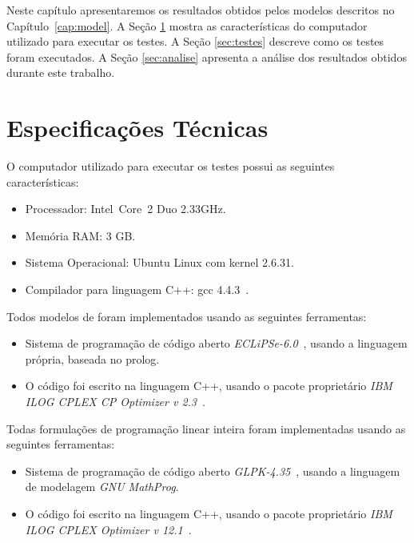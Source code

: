 Neste capítulo apresentaremos os resultados obtidos pelos modelos
descritos no Capítulo~\ref{cap:model}. A Seção \ref{sec:tspec} mostra
as características do computador utilizado para executar os testes. A
Seção \ref{sec:testes} descreve como os testes foram executados. A
Seção \ref{sec:analise} apresenta a análise dos resultados obtidos
durante este trabalho.

\section{Especificações Técnicas}
\label{sec:tspec}
O computador utilizado para executar os testes possui as seguintes
características:

\begin{itemize}
  \item{Processador: Intel\textregistered{}~Core\texttrademark~2 Duo
  2.33GHz.}

  \item{Memória RAM: 3 GB.}
  
  \item{Sistema Operacional: Ubuntu Linux com kernel 2.6.31.}

  \item{Compilador para linguagem C++: gcc 4.4.3~\cite{gcc*2012}.}

\end{itemize}

Todos modelos de \pr{} foram implementados usando as seguintes
ferramentas:

\begin{itemize}
  \item{Sistema de programação de código
  aberto \textit{ECLiPSe-6.0}~\cite{eclipse*2009}, usando a linguagem
  própria, baseada no prolog.}
  
 \item{O código foi escrito na linguagem C++, usando o pacote
  proprietário \textit{IBM\textregistered{} ILOG\textregistered{}
  CPLEX\textregistered{} CP Optimizer v 2.3}~\cite{ilogcp*2011}.}
\end{itemize}

Todas formulações de programação linear inteira foram implementadas
usando as seguintes ferramentas:

\begin{itemize}
  \item{Sistema de programação de código
  aberto \textit{GLPK-4.35}~\cite{glpk*2010}, usando a linguagem de
  modelagem \textit{GNU MathProg}.}
  
  \item{O código foi escrito na linguagem C++, usando o pacote
  proprietário \textit{IBM\textregistered{} ILOG\textregistered{}
  CPLEX\textregistered{} Optimizer v 12.1}~\cite{ilogcplex*2011}.}
\end{itemize}

